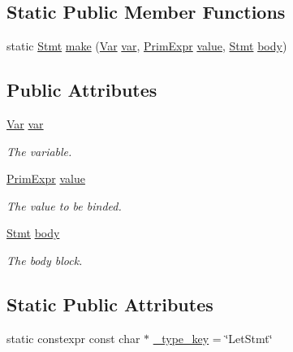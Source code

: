 \subsection*{Static Public Member Functions}
\begin{DoxyCompactItemize}
\item 
static \hyperlink{classtvm_1_1tir_1_1Stmt}{Stmt} \hyperlink{classtvm_1_1tir_1_1LetStmtNode_a8f0084b73dd967346828e0b8586f40ed}{make} (\hyperlink{classtvm_1_1tir_1_1Var}{Var} \hyperlink{classtvm_1_1tir_1_1LetStmtNode_ae701bd89e0cafb77ae5f9eec127d1fe8}{var}, \hyperlink{classtvm_1_1PrimExpr}{Prim\+Expr} \hyperlink{classtvm_1_1tir_1_1LetStmtNode_a3cf16e336e30a31fc78cc9291b655691}{value}, \hyperlink{classtvm_1_1tir_1_1Stmt}{Stmt} \hyperlink{classtvm_1_1tir_1_1LetStmtNode_a91c45a2872aa76e40b39328ce7b7888c}{body})
\end{DoxyCompactItemize}
\subsection*{Public Attributes}
\begin{DoxyCompactItemize}
\item 
\hyperlink{classtvm_1_1tir_1_1Var}{Var} \hyperlink{classtvm_1_1tir_1_1LetStmtNode_ae701bd89e0cafb77ae5f9eec127d1fe8}{var}
\begin{DoxyCompactList}\small\item\em The variable. \end{DoxyCompactList}\item 
\hyperlink{classtvm_1_1PrimExpr}{Prim\+Expr} \hyperlink{classtvm_1_1tir_1_1LetStmtNode_a3cf16e336e30a31fc78cc9291b655691}{value}
\begin{DoxyCompactList}\small\item\em The value to be binded. \end{DoxyCompactList}\item 
\hyperlink{classtvm_1_1tir_1_1Stmt}{Stmt} \hyperlink{classtvm_1_1tir_1_1LetStmtNode_a91c45a2872aa76e40b39328ce7b7888c}{body}
\begin{DoxyCompactList}\small\item\em The body block. \end{DoxyCompactList}\end{DoxyCompactItemize}
\subsection*{Static Public Attributes}
\begin{DoxyCompactItemize}
\item 
static constexpr const char $\ast$ \hyperlink{classtvm_1_1tir_1_1LetStmtNode_a4b1d0004f632e9294d233db436262d48}{\+\_\+type\+\_\+key} = \char`\"{}Let\+Stmt\char`\"{}
\end{DoxyCompactItemize}


